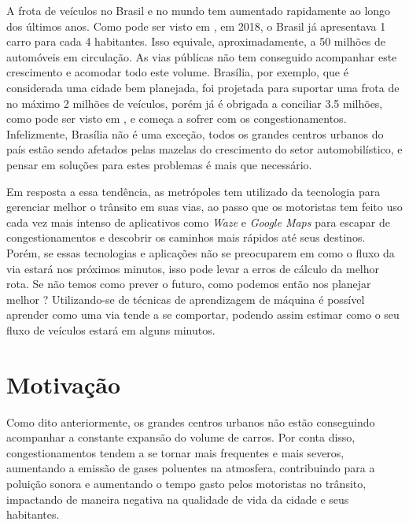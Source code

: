 
A frota  de  veículos no Brasil e no mundo tem aumentado rapidamente ao longo  dos últimos anos. Como pode ser visto em \cite{G1}, em 2018, o Brasil já apresentava 1 carro para cada 4 habitantes. Isso equivale, aproximadamente, a 50 milhões de automóveis em circulação. As vias públicas não tem conseguido acompanhar este crescimento e acomodar todo este volume. Brasília, por exemplo, que é considerada uma cidade bem planejada, foi projetada para suportar uma frota de no máximo 2 milhões de veículos, porém já é obrigada a conciliar 3.5 milhões, como pode ser visto em \cite{detran_2018}, e começa a sofrer com os congestionamentos. Infelizmente, Brasília não é uma exceção, todos os grandes centros urbanos do país estão sendo afetados pelas mazelas do crescimento do setor automobilístico, e pensar em soluções para estes problemas é mais que necessário.

Em resposta a essa tendência, as metrópoles tem utilizado da tecnologia para gerenciar melhor o trânsito em suas vias, ao passo que os motoristas tem feito uso cada vez mais intenso de aplicativos como \textit{Waze} e \textit{Google Maps} para escapar de congestionamentos e descobrir os caminhos mais rápidos até seus destinos. Porém, se essas tecnologias e aplicações não se preocuparem em como o fluxo da via estará nos próximos minutos, isso pode levar a erros de cálculo da melhor rota. Se não temos como prever o futuro, como podemos então nos planejar melhor ? Utilizando-se de técnicas de aprendizagem de máquina é possível aprender como uma via tende a se comportar, podendo assim estimar como o seu fluxo de veículos estará em alguns minutos.


\section{Motivação}
Como dito anteriormente, os grandes centros urbanos não estão conseguindo acompanhar a constante expansão do volume de carros. Por conta disso, congestionamentos tendem a se tornar mais frequentes e mais severos, aumentando a emissão de gases poluentes na atmosfera, contribuindo para a poluição sonora e aumentando o tempo gasto pelos motoristas no trânsito, impactando de maneira negativa na qualidade de vida da cidade e seus habitantes. %

